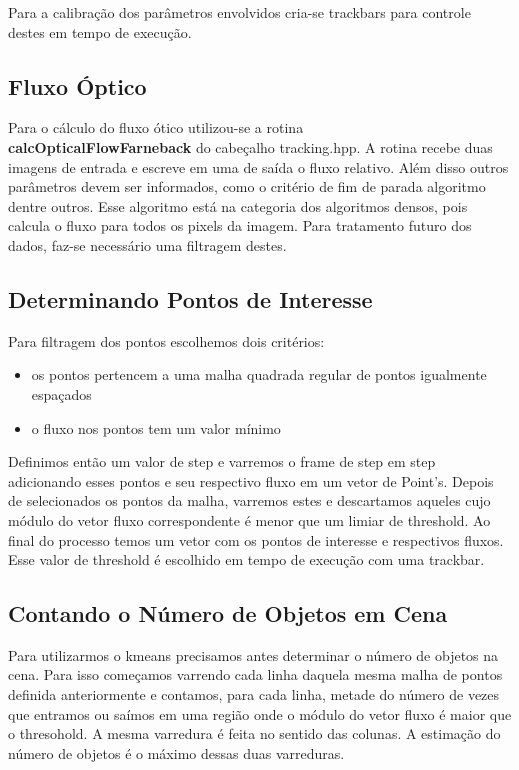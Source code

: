 \documentclass[journal]{IEEEtran}
\begin{document}
Para a calibração dos parâmetros envolvidos cria-se trackbars para 
controle destes em tempo de execução.

\newpage 
\subsection{Fluxo Óptico}

Para o cálculo do fluxo ótico utilizou-se a rotina \\ 
\textbf{calcOpticalFlowFarneback} do cabeçalho tracking.hpp. A rotina
recebe duas imagens de entrada e escreve em uma de saída o fluxo 
relativo. Além disso outros parâmetros devem ser informados, como o 
critério de fim de parada algoritmo dentre outros. Esse algoritmo 
está na categoria dos algoritmos densos, pois calcula o fluxo para 
todos os pixels da imagem. Para tratamento futuro dos dados, faz-se 
necessário uma filtragem destes.

\subsection{Determinando Pontos de Interesse}
Para filtragem dos pontos escolhemos dois critérios:
\begin{itemize}
 \item os pontos pertencem a uma malha quadrada regular de pontos 
igualmente espaçados
  \item o fluxo nos pontos tem um valor mínimo
\end{itemize}
Definimos então um valor de step e varremos o frame de step em step 
adicionando esses pontos e seu respectivo fluxo em um vetor de 
Point's. Depois de selecionados os pontos da malha, varremos estes e 
descartamos aqueles cujo módulo do vetor fluxo correspondente é menor 
que um limiar de threshold. Ao final do processo temos um vetor com 
os pontos de interesse e respectivos fluxos. Esse valor de threshold 
é escolhido em tempo de execução com uma trackbar.

\subsection{Contando o Número de Objetos em Cena}
Para utilizarmos o kmeans precisamos antes determinar o número de 
objetos na cena. Para isso começamos varrendo cada linha daquela 
mesma malha de pontos definida anteriormente e contamos, para cada 
linha, metade do número de vezes que entramos ou saímos em uma região 
onde o módulo do vetor fluxo é maior que o thresohold. A mesma 
varredura é feita no sentido das colunas. A estimação do 
número de objetos é o máximo dessas duas varreduras.
\end{document}
